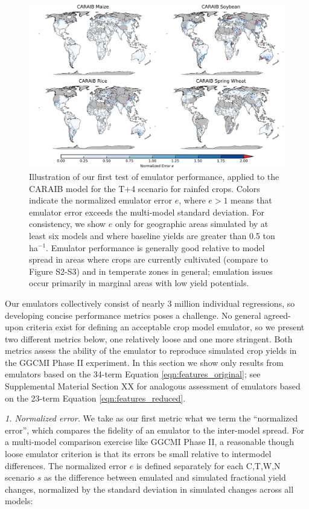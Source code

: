 \documentclass[gmd, manuscript]{copernicus} %
\begin{document}
\begin{figure}[ht]
\centering
    \includegraphics[width=16.3cm]{figures/CARAIB_spatial_error.png}
    \caption{
    Illustration of our first test of emulator performance, applied to the CARAIB model for the T+4 scenario for rainfed crops. 
    Colors indicate the normalized emulator error $e$, where $e > 1$ means that emulator error exceeds the multi-model standard deviation. 
    For consistency, we show $e$ only for geographic areas simulated by at least six models and where baseline yields are greater than 0.5 ton ha$^{-1}$.
    Emulator performance is generally good relative to model spread in areas where crops are currently cultivated (compare to Figure S2-S3) and in temperate zones in general; emulation issues occur primarily in marginal areas with low yield potentials. 
    }
   \label{fig:error}
\end{figure}

Our emulators collectively consist of nearly 3 million individual regressions, so developing concise performance metrics poses a challenge.
No general agreed-upon criteria exist for defining an acceptable crop model emulator, so we present two different metrics below, one relatively loose and one more stringent.  
Both metrics assess the ability of the emulator to reproduce simulated crop yields in the GGCMI Phase II experiment. 
In this section we show only results from emulators based on the 34-term Equation \ref{eqn:features_original};
see Supplemental Material Section XX for analogous assessment of emulators based on the 23-term Equation \ref{eqn:features_reduced}.

\smallskip
\textit{1. Normalized error.} 
We take as our first metric what we term the ``normalized error'', which compares the fidelity of an emulator to the inter-model spread. 
For a multi-model comparison exercise like GGCMI Phase II, a reasonable though loose emulator criterion is that its errors be small relative to intermodel differences. The normalized error $e$ is defined separately for each C,T,W,N scenario $s$ as the difference between emulated and simulated fractional yield changes, normalized by the standard deviation in simulated changes across all models: 
\end{document}
